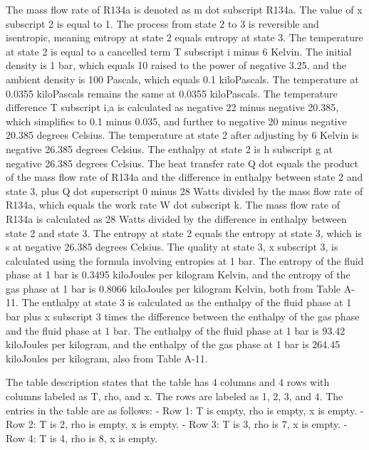 The mass flow rate of R134a is denoted as m dot subscript R134a. The value of x subscript 2 is equal to 1. The process from state 2 to 3 is reversible and isentropic, meaning entropy at state 2 equals entropy at state 3. The temperature at state 2 is equal to a cancelled term T subscript i minus 6 Kelvin. The initial density is 1 bar, which equals 10 raised to the power of negative 3.25, and the ambient density is 100 Pascals, which equals 0.1 kiloPascals. The temperature at 0.0355 kiloPascals remains the same at 0.0355 kiloPascals. The temperature difference T subscript i,a is calculated as negative 22 minus negative 20.385, which simplifies to 0.1 minus 0.035, and further to negative 20 minus negative 20.385 degrees Celsius. The temperature at state 2 after adjusting by 6 Kelvin is negative 26.385 degrees Celsius. The enthalpy at state 2 is h subscript g at negative 26.385 degrees Celsius. The heat transfer rate Q dot equals the product of the mass flow rate of R134a and the difference in enthalpy between state 2 and state 3, plus Q dot superscript 0 minus 28 Watts divided by the mass flow rate of R134a, which equals the work rate W dot subscript k. The mass flow rate of R134a is calculated as 28 Watts divided by the difference in enthalpy between state 2 and state 3. The entropy at state 2 equals the entropy at state 3, which is s at negative 26.385 degrees Celsius. The quality at state 3, x subscript 3, is calculated using the formula involving entropies at 1 bar. The entropy of the fluid phase at 1 bar is 0.3495 kiloJoules per kilogram Kelvin, and the entropy of the gas phase at 1 bar is 0.8066 kiloJoules per kilogram Kelvin, both from Table A-11. The enthalpy at state 3 is calculated as the enthalpy of the fluid phase at 1 bar plus x subscript 3 times the difference between the enthalpy of the gas phase and the fluid phase at 1 bar. The enthalpy of the fluid phase at 1 bar is 93.42 kiloJoules per kilogram, and the enthalpy of the gas phase at 1 bar is 264.45 kiloJoules per kilogram, also from Table A-11.

The table description states that the table has 4 columns and 4 rows with columns labeled as T, rho, and x. The rows are labeled as 1, 2, 3, and 4. The entries in the table are as follows:
- Row 1: T is empty, rho is empty, x is empty.
- Row 2: T is 2, rho is empty, x is empty.
- Row 3: T is 3, rho is 7, x is empty.
- Row 4: T is 4, rho is 8, x is empty.